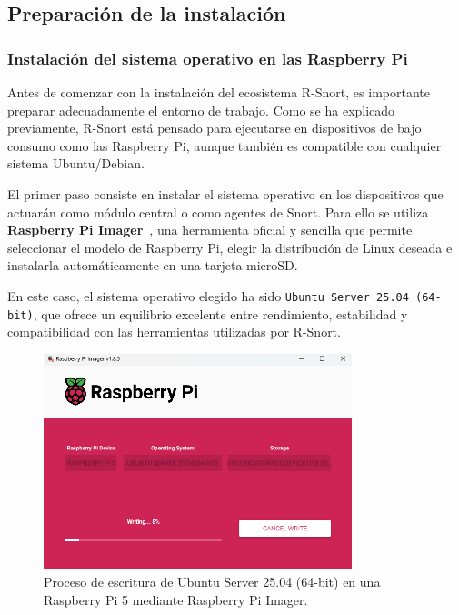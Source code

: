 \documentclass[11pt,a4paper,twoside]{report}
\begin{document}
\subsection{Preparación de la instalación}

\subsubsection{Instalación del sistema operativo en las Raspberry Pi}

Antes de comenzar con la instalación del ecosistema R-Snort, es importante preparar adecuadamente el entorno de trabajo. Como se ha explicado previamente, R-Snort está pensado para ejecutarse en dispositivos de bajo consumo como las Raspberry Pi, aunque también es compatible con cualquier sistema Ubuntu/Debian.\newline

El primer paso consiste en instalar el sistema operativo en los dispositivos que actuarán como módulo central o como agentes de Snort. Para ello se utiliza \textbf{Raspberry Pi Imager}~\cite{raspberrypi_software}, una herramienta oficial y sencilla que permite seleccionar el modelo de Raspberry Pi, elegir la distribución de Linux deseada e instalarla automáticamente en una tarjeta microSD.\newline

En este caso, el sistema operativo elegido ha sido \texttt{Ubuntu Server 25.04 (64-bit)}, que ofrece un equilibrio excelente entre rendimiento, estabilidad y compatibilidad con las herramientas utilizadas por R-Snort.

\begin{figure}[H]
	\centering
	\includegraphics[width=0.8\textwidth]{install/1.png}
	\caption{Proceso de escritura de Ubuntu Server 25.04 (64-bit) en una Raspberry Pi 5 mediante Raspberry Pi Imager.}
	\label{fig:preparacion-sistema}
\end{figure}
\end{document}
